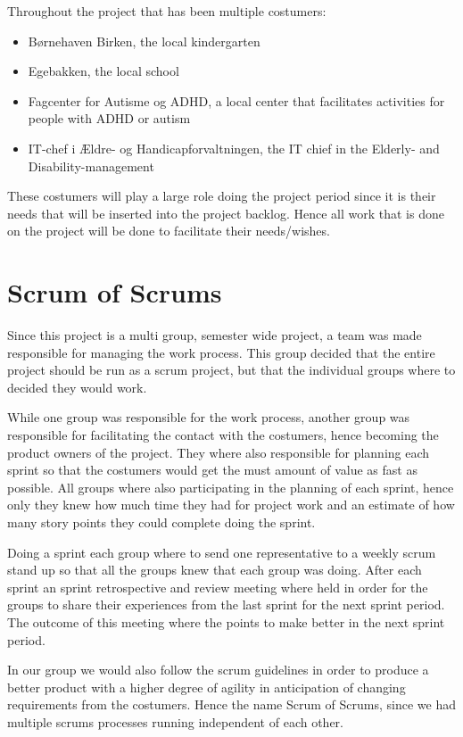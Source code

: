 Throughout the project that has been multiple costumers:

\begin{itemize}
	\item Børnehaven Birken, the local kindergarten
	\item Egebakken, the local school
	\item Fagcenter for Autisme og ADHD, a local center that facilitates activities for people with ADHD or autism
	\item IT-chef i Ældre- og Handicapforvaltningen, the IT chief in the Elderly- and Disability-management
\end{itemize}

These costumers will play a large role doing the project period since it is their needs that will be inserted into the project backlog. 
Hence all work that is done on the project will be done to facilitate their needs/wishes.

\section{Scrum of Scrums}
Since this project is a multi group, semester wide project, a team was made responsible for managing the work process. 
This group decided that the entire project should be run as a scrum project, but that the individual groups where to decided they would work.

While one group was responsible for the work process, another group was responsible for facilitating the contact with the costumers, hence becoming the product owners of the project. 
They where also responsible for planning each sprint so that the costumers would get the must amount of value as fast as possible.
All groups where also participating in the planning of each sprint, hence only they knew how much time they had for project work and an estimate of how many story points they could complete doing the sprint.

Doing a sprint each group where to send one representative to a weekly scrum stand up so that all the groups knew that each group was doing. 
After each sprint an sprint retrospective and review meeting where held in order for the groups to share their experiences from the last sprint for the next sprint period.
The outcome of this meeting where the points to make better in the next sprint period.

In our group we would also follow the scrum guidelines in order to produce a better product with a higher degree of agility in anticipation of changing requirements from the costumers.
Hence the name Scrum of Scrums, since we had multiple scrums processes running independent of each other.

